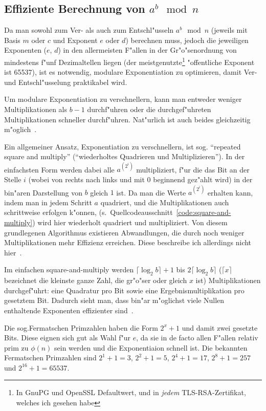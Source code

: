 \documentclass[12pt]{article}
\begin{document}
\subsection{Effiziente Berechnung von $a^b \mod n$}
\label{subsec:practical:exp}

Da man sowohl zum Ver- als auch zum Entschl"usseln $a^b \mod n$
(jeweils mit Basis $m$ oder $c$ und Exponent $e$ oder $d$) berechnen muss,
jedoch die jeweiligen Exponenten ($e$, $d$) in den allermeisten F"allen
in der Gr"o"senordnung von mindestens f"unf Dezimaltellen liegen
(der meistgenutzte\footnote{In GnuPG und OpenSSL Defaultwert,
und in \emph{jedem} TLS-RSA-Zertifikat, welches ich gesehen habe}
"offentliche Exponent ist 65537),
ist es notwendig, modulare Exponentiation zu optimieren,
damit Ver- und Entschl"usselung praktikabel wird.

Um modulare Exponentiation zu verschnellern, kann man entweder weniger Multiplikationen
als $b-1$ durchf"uhren oder die durchgef"uhreten Multiplikationen schneller durchf"uhren.
Nat"urlich ist auch beides gleichzeitig m"oglich~\cite{hac}.

Ein allgemeiner Ansatz, Exponentiation zu verschnellern, ist sog.\@
"`repeated square and multiply"' ("`wiederholtes Quadrieren und Multiplizieren"').
In der einfachsten Form werden dabei alle $a^{(2^i)}$ multipliziert,
f"ur die das Bit an der Stelle $i$ (wobei von rechts nach links und mit 0 beginnend gez"ahlt wird)
in der bin"aren Darstellung von $b$ gleich $1$ ist.
Da man die Werte $a^{(2^i)}$ erhalten kann, indem man in jedem Schritt $a$ quadriert,
und die Multiplikationen auch schrittweise erfolgen k"onnen, (s.~Quellcodeausschnitt~\ref{code:square-and-multiply})
wird hier wiederholt quadriert und multipliziert.
Von diesem grundlegenen Algorithmus existieren Abwandlungen,
die durch noch weniger Multiplikationen mehr Effizienz erreichen.
Diese beschreibe ich allerdings nicht hier~\cite{hac}.

Im einfachen square-and-multiply werden $\lceil \log_2 b \rceil + 1$ bis $2 \lceil \log_2 b \rceil$
($\lceil x \rceil$ bezeichnet die kleinste ganze Zahl, die gr"o"ser oder gleich $x$ ist)
Multiplikationen durchgef"uhrt: eine Quadratur pro Bit sowie eine Ergebnismultiplikation pro ge\-setz\-tem Bit.
Dadurch sieht man, dass bin"ar m"oglichst viele Nullen enthaltende Exponenten effizienter sind~\cite{hac}.

Die sog.\@ Fermatschen Primzahlen haben die Form $2^x + 1$ und damit zwei gesetzte Bits.
Diese eignen sich gut als Wahl f"ur $e$, da sie in de facto allen F"allen relativ prim zu
$\phi(n)$ sein werden und die Exponentiaion schnell ist.
Die bekannten Fermatschen Primzahlen sind $2^1 + 1 = 3$, $2^2+1 = 5$, $2^4 + 1 = 17$, $2^8+1 = 257$ und $2^{16} + 1 = 65537$.
\end{document}
